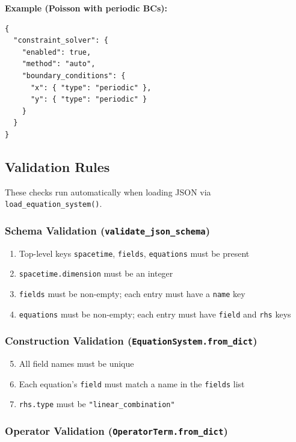 \textbf{Example (Poisson with periodic BCs):}

\begin{lstlisting}[style=json]
{
  "constraint_solver": {
    "enabled": true,
    "method": "auto",
    "boundary_conditions": {
      "x": { "type": "periodic" },
      "y": { "type": "periodic" }
    }
  }
}
\end{lstlisting}


\subsection{Validation Rules}
\label{sec:json-validation}

These checks run automatically when loading JSON via \texttt{load\_equation\_system()}.

\subsubsection{Schema Validation (\texttt{validate\_json\_schema})}
\label{sec:json-validation-schema}

\begin{enumerate}
  \item Top-level keys \texttt{spacetime}, \texttt{fields}, \texttt{equations} must be present
  \item \texttt{spacetime.dimension} must be an integer
  \item \texttt{fields} must be non-empty; each entry must have a \texttt{name} key
  \item \texttt{equations} must be non-empty; each entry must have \texttt{field} and \texttt{rhs} keys
\end{enumerate}

\subsubsection{Construction Validation (\texttt{EquationSystem.from\_dict})}
\label{sec:json-validation-construction}

\begin{enumerate}
  \setcounter{enumi}{4}
  \item All field names must be unique
  \item Each equation's \texttt{field} must match a name in the \texttt{fields} list
  \item \texttt{rhs.type} must be \texttt{"linear\_combination"}
\end{enumerate}

\subsubsection{Operator Validation (\texttt{OperatorTerm.from\_dict})}
\label{sec:json-validation-operator}

